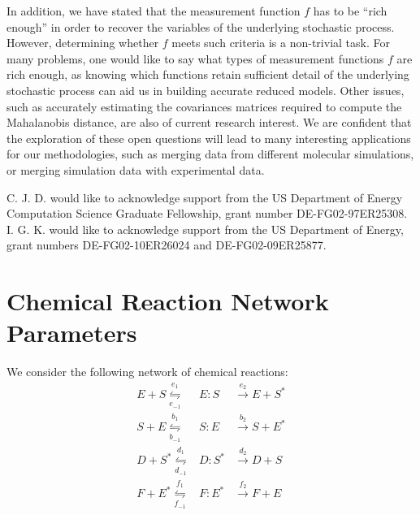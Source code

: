 \documentclass[aip,jcp,preprint]{revtex4-1}
\begin{document}
In addition, we have stated that the measurement function $f$ has to be ``rich enough'' in order to recover the variables of the underlying stochastic process.
%
However, determining whether $f$ meets such criteria is a non-trivial task.
%
For many problems, one would like to say what types of measurement functions $f$ are rich enough, 
as knowing which functions retain sufficient detail of the underlying stochastic process can aid us in building accurate reduced models.
%
Other issues, such as accurately estimating the covariances matrices required to compute the Mahalanobis distance, are also of current research interest.
%
We are confident that the exploration of these open questions will lead to many interesting applications for our methodologies, such as merging data from different molecular simulations, or merging simulation data with experimental data.

\begin{acknowledgments}
C. J. D. would like to acknowledge support from the US Department of Energy Computation Science Graduate Fellowship, grant number DE-FG02-97ER25308.
%
I. G. K. would like to acknowledge support from the US Department of Energy, grant numbers DE-FG02-10ER26024 and DE-FG02-09ER25877.
\end{acknowledgments}



\appendix

\section{Chemical Reaction Network Parameters} \label{app:rxn}

We consider the following network of chemical reactions:
\begin{equation}
\begin{array}{rcl}
E + S \overset{e_1}{\underset{e_{-1}}{\leftrightharpoons}} & E:S & \overset{e_2}{\rightarrow} E + S^{*} \\
S + E \overset{b_1}{\underset{b_{-1}}{\leftrightharpoons}} & S:E & \overset{b_2}{\rightarrow} S + E^{*}\\
D + S^{*} \overset{d_1}{\underset{d_{-1}}{\leftrightharpoons}} & D:S^{*} & \overset{d_2}{\rightarrow} D + S\\
F + E^{*} \overset{f_1}{\underset{f_{-1}}{\leftrightharpoons}} & F:E^{*} & \overset{f_2}{\rightarrow} F + E
\end{array}
\end{equation}
\end{document}
